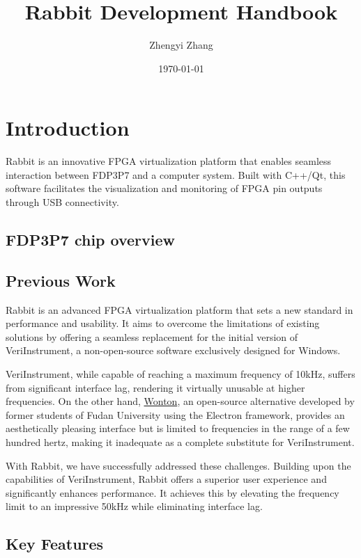 \documentclass{article}
\title{Rabbit Development Handbook}
\author{Zhengyi Zhang}
\date{\today}
\begin{document}
\maketitle

\tableofcontents

\section{Introduction}

Rabbit is an innovative FPGA virtualization platform that enables seamless interaction between FDP3P7 and a computer system. Built with C++/Qt, this software facilitates the visualization and monitoring of FPGA pin outputs through USB connectivity.

\subsection{FDP3P7 chip overview}



\subsection{Previous Work}

Rabbit is an advanced FPGA virtualization platform that sets a new standard in performance and usability. It aims to overcome the limitations of existing solutions by offering a seamless replacement for the initial version of VeriInstrument, a non-open-source software exclusively designed for Windows.

VeriInstrument, while capable of reaching a maximum frequency of 10kHz, suffers from significant interface lag, rendering it virtually unusable at higher frequencies. On the other hand, \href{https://github.com/ChayCai/Wonton_master}{Wonton}, an open-source alternative developed by former students of Fudan University using the Electron framework, provides an aesthetically pleasing interface but is limited to frequencies in the range of a few hundred hertz, making it inadequate as a complete substitute for VeriInstrument.

With Rabbit, we have successfully addressed these challenges. Building upon the capabilities of VeriInstrument, Rabbit offers a superior user experience and significantly enhances performance. It achieves this by elevating the frequency limit to an impressive 50kHz while eliminating interface lag.


\subsection{Key Features}
\end{document}
